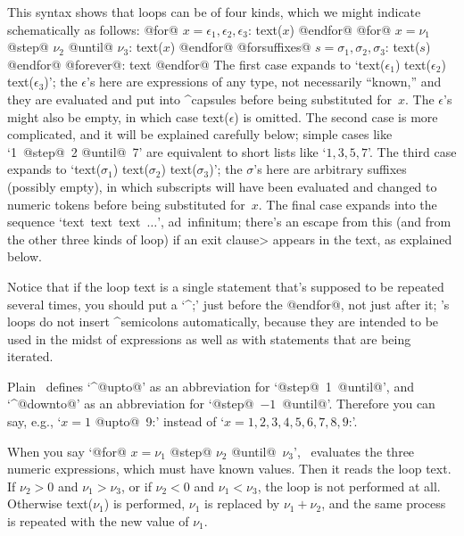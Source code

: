 This syntax shows that loops can be of four kinds, which we might
indicate schematically as follows:
\begindisplay
@for@ $x=\epsilon_1,\epsilon_2,\epsilon_3$: text($x$) @endfor@\cr
{}
@for@ $x=\nu_1$ @step@ $\nu_2$ @until@ $\nu_3$: text($x$) @endfor@\cr
{}
@forsuffixes@ $s=\sigma_1,\sigma_2,\sigma_3$: text($s$) @endfor@\cr
{}
@forever@: text @endfor@\cr
\enddisplay
The first case expands to
`text($\epsilon_1$) text($\epsilon_2$) text($\epsilon_3$)'; the
$\epsilon$'s here are expressions of any type, not necessarily ``known,''
and they are evaluated and put into ^{capsules} before being substituted
for~$x$. The $\epsilon$'s might also be empty, in which case
text($\epsilon$) is omitted.
The second case is more complicated, and it will be explained carefully
below; simple cases like `1~@step@~2 @until@~7' are equivalent to
short lists like `$1,3,5,7$'. The third case expands to
`text($\sigma_1$) text($\sigma_2$) text($\sigma_3$)'; the $\sigma$'s here
are arbitrary suffixes (possibly empty), in which subscripts will have been
evaluated and changed to numeric tokens before being substituted for~$x$.
The final case expands into the sequence `text~text~text~$\ldots$',
ad~infinitum; there's an escape from this (and from the other three kinds
of loop) if an \<exit clause> appears in the text, as explained below.

Notice that if the loop text is a single statement that's supposed to
be repeated several times, you should put a `^{;}' just before the
@endfor@, not just after it; \MF's loops do not insert ^{semicolons}
automatically, because they are intended to be used in the midst of
expressions as well as with statements that are being iterated.

Plain \MF\ defines `^@upto@' as an abbreviation for `@step@~1~@until@',
and `^@downto@' as an abbreviation for `@step@~$-1$~@until@'. Therefore
you can say, e.g., `\thinspace@for@ $x=1$ @upto@~9:\thinspace' instead of
`\thinspace@for@ $x=1,2,3,4,5,6,7,8,9$:\thinspace'.

\danger When you say `@for@ $x=\nu_1$ @step@ $\nu_2$ @until@~$\nu_3$',
\MF\ evaluates the three numeric expressions, which must have known values.
Then it reads the loop text. If $\nu_2>0$ and $\nu_1>\nu_3$, or if
$\nu_2<0$ and $\nu_1<\nu_3$, the loop is not performed at all. Otherwise
text($\nu_1$) is performed, $\nu_1$ is replaced by $\nu_1+\nu_2$, and
the same process is repeated with the new value of $\nu_1$.

